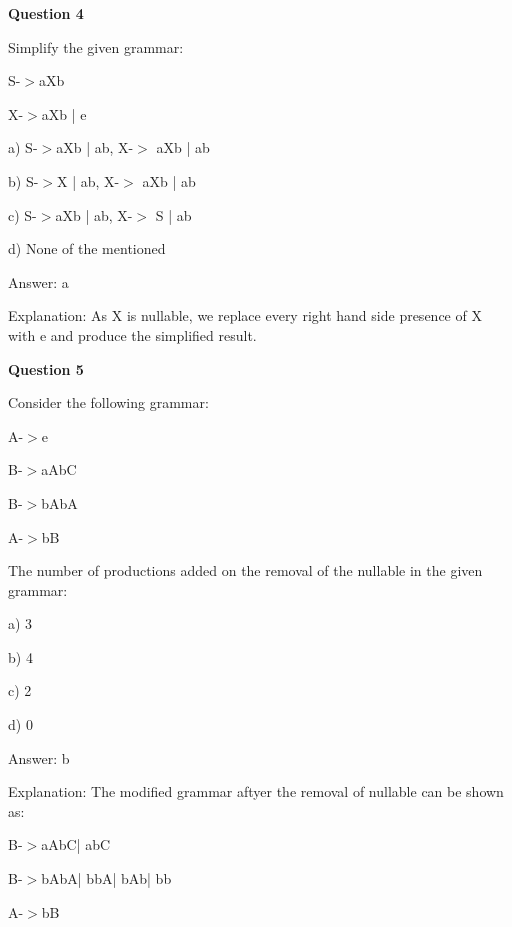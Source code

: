 \documentclass{article}
\begin{document}
\begin{mdframed}[linewidth=1pt, roundcorner=5pt, linecolor=gray!30, backgroundcolor=gray!5]
\textbf{Question 4} 

Simplify the given grammar:

S-$>$aXb

X-$>$aXb | e

a) S-$>$aXb | ab, X-$>$ aXb | ab

b) S-$>$X | ab, X-$>$ aXb | ab

c) S-$>$aXb | ab, X-$>$ S | ab

d) None of the mentioned
\vspace{5pt} \par
\begin{tcolorbox}[colback=green!5, colframe=green!40!black, title=Solution]
Answer: a

Explanation: As X is nullable, we replace every right hand side presence of X with e and produce the simplified result.
\end{tcolorbox}
\end{mdframed}

\begin{mdframed}[linewidth=1pt, roundcorner=5pt, linecolor=gray!30, backgroundcolor=gray!5]
\textbf{Question 5} 

Consider the following grammar:

A-$>$e

B-$>$aAbC

B-$>$bAbA

A-$>$bB

The number of productions added on the removal of the nullable in the given grammar:

a) 3

b) 4

c) 2

d) 0
\vspace{5pt} \par
\begin{tcolorbox}[colback=green!5, colframe=green!40!black, title=Solution]
Answer: b

Explanation: The modified grammar aftyer the removal of nullable can be shown as:

B-$>$aAbC| abC

B-$>$bAbA| bbA|  bAb| bb

A-$>$bB
\end{tcolorbox}
\end{mdframed}
\end{document}
